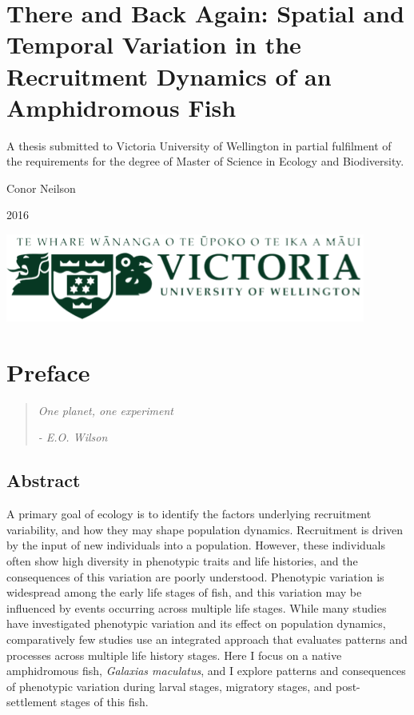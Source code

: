 \documentclass[]{book}
\author{Conor Neilson}
\date{}
\begin{document}
{
\setcounter{tocdepth}{1}
\tableofcontents
}
\chapter*{There and Back Again: Spatial and Temporal Variation in the
Recruitment Dynamics of an Amphidromous
Fish}\label{there-and-back-again-spatial-and-temporal-variation-in-the-recruitment-dynamics-of-an-amphidromous-fish}

A thesis submitted to Victoria University of Wellington in partial
fulfilment of the requirements for the degree of Master of Science in
Ecology and Biodiversity.

Conor Neilson

2016

\includegraphics{images/cover-image.png}

\chapter*{Preface}\label{preface}

\begin{quote}
\emph{One planet, one experiment}

\emph{- E.O. Wilson}
\end{quote}

\section*{Abstract}\label{abstract}

A primary goal of ecology is to identify the factors underlying
recruitment variability, and how they may shape population dynamics.
Recruitment is driven by the input of new individuals into a population.
However, these individuals often show high diversity in phenotypic
traits and life histories, and the consequences of this variation are
poorly understood. Phenotypic variation is widespread among the early
life stages of fish, and this variation may be influenced by events
occurring across multiple life stages. While many studies have
investigated phenotypic variation and its effect on population dynamics,
comparatively few studies use an integrated approach that evaluates
patterns and processes across multiple life history stages. Here I focus
on a native amphidromous fish, \emph{Galaxias maculatus}, and I explore
patterns and consequences of phenotypic variation during larval stages,
migratory stages, and post-settlement stages of this fish.
\end{document}
